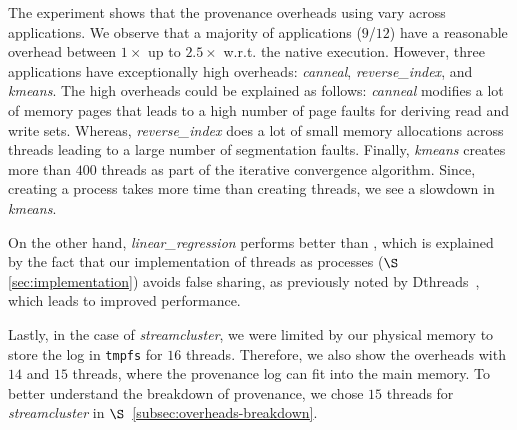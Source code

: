 The experiment shows that the provenance overheads using \projecttitle vary across applications. 
We observe that a majority of applications ($9$/$12$) have a reasonable overhead between $1\times$ up to $2.5\times$ w.r.t. the native execution. However, three applications have exceptionally high overheads:  {\em canneal}, {\em reverse\_index}, and {\em kmeans}. The high overheads could be explained as follows: {\em canneal} modifies a lot of memory pages that leads to a high number of page faults for deriving read and write sets. Whereas, {\em reverse\_index} does a lot of small memory allocations across threads leading to a large number of segmentation faults.  Finally, {\em kmeans} creates more than $400$ threads as part of the iterative convergence algorithm. Since, creating a process takes more time than creating threads, we see a slowdown in {\em kmeans}.


On the other hand, {\em linear\_regression} performs better than \pthreads, which is explained by the fact that our implementation of threads as processes ($\S$\ref{sec:implementation})  avoids false sharing, as previously noted by Dthreads~\cite{dthreads-sosp-2011}, which leads to improved performance.



Lastly, in the case of {\em streamcluster}, we were limited by our physical memory to store the log in {\tt tmpfs} for $16$ threads. Therefore, we also show the overheads with $14$ and $15$ threads,  where the provenance log can fit into the main memory.  To better understand the breakdown of provenance, we chose $15$ threads for {\em streamcluster} in $\S$~\ref{subsec:overheads-breakdown}.



%

